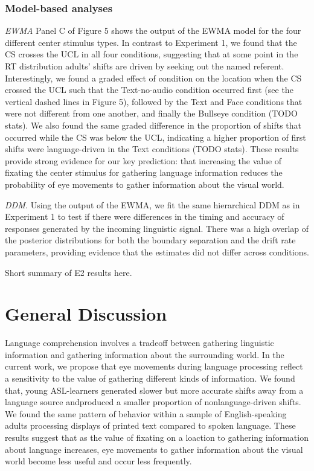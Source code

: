 \documentclass[10pt, letterpaper]{article}
\begin{document}
\subsubsection{Model-based analyses}\label{model-based-analyses-1}

\emph{EWMA} Panel C of Figure 5 shows the output of the EWMA model for
the four different center stimulus types. In contrast to Experiment 1,
we found that the CS crosses the UCL in all four conditions, suggesting
that at some point in the RT distribution adults' shifts are driven by
seeking out the named referent. Interestingly, we found a graded effect
of condition on the location when the CS crossed the UCL such that the
Text-no-audio condition occurred first (see the vertical dashed lines in
Figure 5), followed by the Text and Face conditions that were not
different from one another, and finally the Bullseye condition (TODO
stats). We also found the same graded difference in the proportion of
shifts that occurred while the CS was below the UCL, indicating a higher
proportion of first shifts were language-driven in the Text conditions
(TODO stats). These results provide strong evidence for our key
prediction: that increasing the value of fixating the center stimulus
for gathering language information reduces the probability of eye
movements to gather information about the visual world.

\emph{DDM.} Using the output of the EWMA, we fit the same hierarchical
DDM as in Experiment 1 to test if there were differences in the timing
and accuracy of responses generated by the incoming linguistic signal.
There was a high overlap of the posterior distributions for both the
boundary separation and the drift rate parameters, providing evidence
that the estimates did not differ across conditions.

Short summary of E2 results here.

\section{General Discussion}\label{general-discussion}

Language comprehension involves a tradeoff between gathering linguistic
information and gathering information about the surrounding world. In
the current work, we propose that eye movements during language
processing reflect a sensitivity to the value of gathering different
kinds of information. We found that, young ASL-learners generated slower
but more accurate shifts away from a language source andproduced a
smaller proportion of nonlanguage-driven shifts. We found the same
pattern of behavior within a sample of English-speaking adults
processing displays of printed text compared to spoken language. These
results suggest that as the value of fixating on a loaction to gathering
information about language increases, eye movements to gather
information about the visual world become less useful and occur less
frequently.
\end{document}
